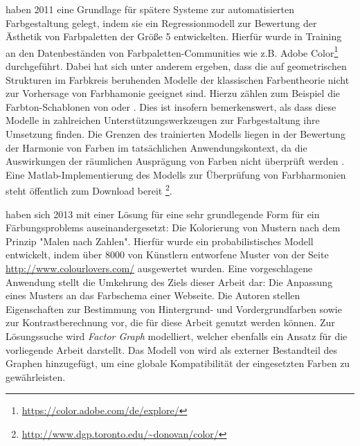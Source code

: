 \documentclass[10pt,a4paper,bibliography=totoc,twocolumn]{scrartcl}
\begin{document}
\citet{colorcomp} haben 2011 eine Grundlage für spätere Systeme zur automatisierten Farbgestaltung gelegt, indem sie ein Regressionmodell zur Bewertung der Ästhetik von Farbpaletten der Größe 5 entwickelten. Hierfür wurde in Training an den Datenbeständen von Farbpaletten-Communities wie z.B. Adobe Color\footnote{\url{https://color.adobe.com/de/explore/}} durchgeführt. Dabei hat sich unter anderem ergeben, dass die auf geometrischen Strukturen im Farbkreis beruhenden Modelle der klassischen Farbentheorie nicht zur Vorhersage von Farbhamonie geeignet sind. Hierzu zählen zum Beispiel die Farbton-Schablonen von \citet{itten} oder \citet{munsell}. Dies ist insofern bemerkenswert, als dass diese Modelle in zahlreichen Unterstützungswerkzeugen zur Farbgestaltung ihre Umsetzung finden. Die Grenzen des trainierten Modells liegen in der Bewertung der Harmonie von Farben im tatsächlichen Anwendungskontext, da die Auswirkungen der räumlichen Ausprägung von Farben nicht überprüft werden \citep{webpage, patterns}. Eine Matlab-Implementierung des Modells zur Überprüfung von Farbharmonien steht öffentlich zum Download bereit \footnote{\url{http://www.dgp.toronto.edu/~donovan/color/}}.

\citet{patterns} haben sich 2013 mit einer Lösung für eine sehr grundlegende Form für ein Färbungsproblems auseinandergesetzt: Die Kolorierung von Mustern nach dem Prinzip "Malen nach Zahlen". Hierfür wurde ein probabilistisches Modell entwickelt, indem über 8000 von Künstlern entworfene Muster von der Seite \url{http://www.colourlovers.com/} ausgewertet wurden. Eine vorgeschlagene Anwendung stellt die Umkehrung des Ziels dieser Arbeit dar: Die Anpassung eines Musters an das Farbschema einer Webseite. Die Autoren stellen Eigenschaften zur Bestimmung von Hintergrund- und Vordergrundfarben sowie zur Kontrastberechnung vor, die für diese Arbeit genutzt werden können. Zur Lösungssuche wird \emph{Factor Graph} modelliert, welcher ebenfalls ein Ansatz für die vorliegende Arbeit darstellt. Das Modell von \citet{colorcomp} wird als externer Bestandteil des Graphen hinzugefügt, um eine globale Kompatibilität der eingesetzten Farben zu gewährleisten.
\end{document}
